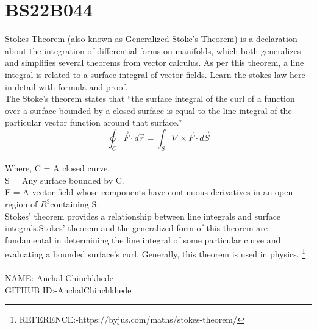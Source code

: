 \section{BS22B044}
Stokes Theorem (also known as Generalized Stoke’s Theorem) is a declaration about the integration of differential forms on manifolds, which both generalizes and simplifies several theorems from vector calculus. As per this theorem, a line integral is related to a surface integral of vector fields. Learn the stokes law here in detail with formula and proof.
\\
The Stoke’s theorem states that “the surface integral of the curl of a function over a surface bounded by a closed surface is equal to the line integral of the particular vector function around that surface.”
\begin{equation}
    \oint_C \vec{F} \cdot d\vec{r} = \int_S \nabla \times \vec{F} \cdot d\vec{S}
\end{equation}\\
Where,
C = A closed curve. \\
S = Any surface bounded by C.\\
F = A vector field whose components have continuous derivatives in an open region of $R^3$containing S.\\ 
Stokes’ theorem provides a relationship between line integrals and surface integrals.Stokes’ theorem and the generalized form of this theorem are fundamental in determining the line integral of some particular curve and evaluating a bounded surface’s curl. Generally, this theorem is used in physics.
\footnote{REFERENCE:-https://byjus.com/maths/stokes-theorem/}
\\
\\
NAME:-Anchal Chinchkhede  \\
GITHUB ID:-AnchalChinchkhede
